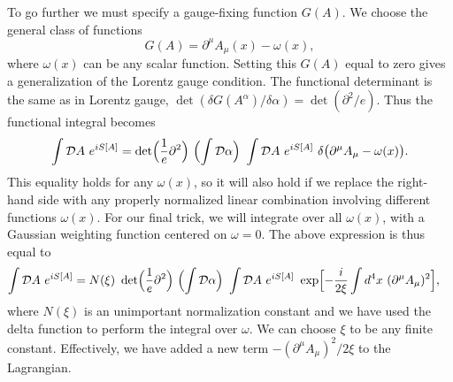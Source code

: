 To go further we must specify a gauge-fixing function $G(A)$.  We choose the
general class of functions
\begin{equation}
  G(A) = \partial^\mu A_\mu(x) - \omega(x) ,
  \label{eq:9.55}
\end{equation}
where $\omega(x)$ can be any scalar function.  Setting this $G(A)$ equal to
zero gives a generalization of the Lorentz gauge condition.  The functional
determinant is the same as in Lorentz gauge,
$\det(\delta G(A^\alpha)/\delta\alpha) = \det(\partial^2/e)$.  Thus the
functional integral becomes
\begin{equation}
  \int \mathcal{D}A\ e^{iS[A]} = \det\Bigl( \frac{1}{e}\partial^2 \Bigr)\
    \Bigl( \int \mathcal{D}\alpha \Bigr)\ \int \mathcal{D}A\ e^{iS[A]}\
    \delta\bigl( \partial^\mu A_\mu - \omega(x) \bigr) .
\end{equation}
This equality holds for any $\omega(x)$, so it will also hold if we replace the
right-hand side with any properly normalized linear combination involving
different functions $\omega(x)$.  For our final trick, we will integrate over
all $\omega(x)$, with a Gaussian weighting function centered on $\omega=0$.
The above expression is thus equal to
\begin{equation}
  \begin{aligned}
    \int \mathcal{D}A\ e^{iS[A]} &= N(\xi)\ \det\Bigl( \frac{1}{e}\partial^2
      \Bigr)\ \Bigl( \int \mathcal{D}\alpha \Bigr)\ \int \mathcal{D}A\
      e^{iS[A]}\ \exp\Bigl[ -\frac{i}{2\xi}\int d^4x\
        (\partial^\mu A_\mu)^2 \Bigr] ,
  \end{aligned}
  \label{eq:9.56}
\end{equation}
where $N(\xi)$ is an unimportant normalization constant and we have used the
delta function to perform the integral over $\omega$.  We can choose $\xi$ to
be any finite constant.  Effectively, we have added a new term
$-(\partial^\mu A_\mu)^2/2\xi$ to the Lagrangian.

